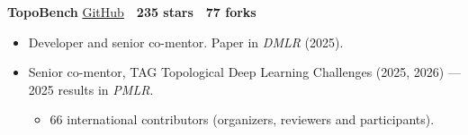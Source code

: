 \noindent\textbf{TopoBench} \hfill {\small \href{https://github.com/geometric-intelligence/TopoBench}{GitHub} \,\textperiodcentered\, \textbf{235 stars} \,\textperiodcentered\, \textbf{77 forks}}
\begin{itemize}[leftmargin=*,itemsep=0.1em,topsep=0.15em,parsep=0pt,partopsep=0pt]
    \item Developer and senior co-mentor. Paper in \textit{DMLR} (2025).
    \item Senior co-mentor, TAG Topological Deep Learning Challenges (2025, 2026) --- 2025 results in \textit{PMLR}.
    \begin{itemize}[leftmargin=*,itemsep=0.1em,topsep=0.15em,parsep=0pt,partopsep=0pt]
        \item 66 international contributors (organizers, reviewers and participants).
    \end{itemize}
\end{itemize}